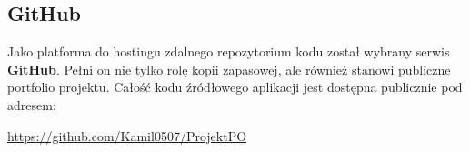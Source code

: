 \subsection*{GitHub}
Jako platforma do hostingu zdalnego repozytorium kodu został wybrany serwis \textbf{GitHub}. Pełni on nie tylko rolę kopii zapasowej, ale również stanowi publiczne portfolio projektu. Całość kodu źródłowego aplikacji jest dostępna publicznie pod adresem:
\begin{center}
    \url{https://github.com/Kamil0507/ProjektPO}
\end{center}